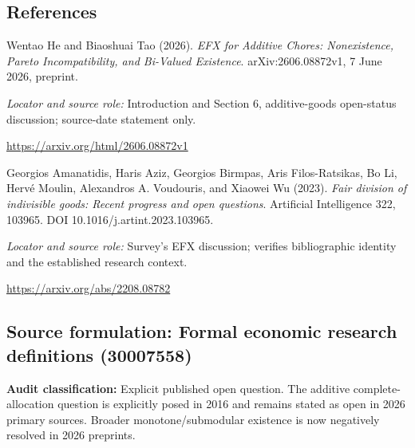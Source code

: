 \documentclass[11pt,a4paper]{article}
\begin{document}
\subsection*{References}
{\footnotesize\raggedright
\begin{enumerate}[label={\textbf{[S\arabic*]}},leftmargin=3em]
\item Wentao He and Biaoshuai Tao (2026). \emph{EFX for Additive Chores: Nonexistence, Pareto Incompatibility, and Bi-Valued Existence}. arXiv:2606.08872v1, 7 June 2026, preprint.\par
\textit{Locator and source role:} Introduction and Section 6, additive-goods open-status discussion; source-date statement only.\par
\url{https://arxiv.org/html/2606.08872v1}
\item Georgios Amanatidis, Haris Aziz, Georgios Birmpas, Aris Filos-Ratsikas, Bo Li, Hervé Moulin, Alexandros A. Voudouris, and Xiaowei Wu (2023). \emph{Fair division of indivisible goods: Recent progress and open questions}. Artificial Intelligence 322, 103965. DOI 10.1016/j.artint.2023.103965.\par
\textit{Locator and source role:} Survey's EFX discussion; verifies bibliographic identity and the established research context.\par
\url{https://arxiv.org/abs/2208.08782}
\end{enumerate}}

\subsection*{Source formulation: Formal economic research definitions (30007558)}
\label{definitions:problem:30007558}
\textbf{Audit classification:} Explicit published open question. The additive complete-allocation question is explicitly posed in 2016 and remains stated as open in 2026 primary sources. Broader monotone/submodular existence is now negatively resolved in 2026 preprints.
\end{document}
